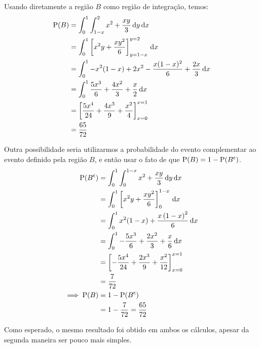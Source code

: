 \begin{example}
\begin{center}
    \end{center}

    Usando diretamente a região $B$ como região de integração,
    temos:
    \begin{align*}
        \operatorname{P}(B) &= 
            \int_0^1
                \int_{1-x}^2 x^2 + \frac{xy}{3} \,\mathrm{d} y
            \,\mathrm{d} x \\
        &= \int_0^1
            \left[x^2 y + \frac{xy^2}{6}\right]_{y=1-x}^{y=2}
        \,\mathrm{d} x \\
        &= \int_0^1
            - x^2 (1 - x) + 2 x^2 - \frac{x (1 - x)^2}{6} + \frac{2 x}{3}
        \,\mathrm{d} x \\
        &= \int_0^1
            \frac{5 x^{3}}{6} + \frac{4 x^{2}}{3} + \frac{x}{2}
        \,\mathrm{d} x \\
        &= \left[
            \frac{5 x^{4}}{24} + \frac{4 x^{3}}{9} + \frac{x^{2}}{4}
        \right]_{x=0}^{x=1} \\
        &= \frac{65}{72}
    \end{align*}

    Outra possibilidade seria utilizarmos a probabilidade
    do evento complementar ao evento definido pela região $B$,
    e então usar o fato de que $\operatorname{P}(B) = 1 - \operatorname{P}({B}^{\mathsf{c}})$.
    \begin{align*}
        \operatorname{P}({B}^{\mathsf{c}}) &= 
            \int_0^1
                \int_0^{1-x} x^2 + \frac{xy}{3} \,\mathrm{d} y
            \,\mathrm{d} x \\
        &= \int_0^1
            \left[x^2 y + \frac{xy^2}{6}\right]_0^{1-x}
        \,\mathrm{d} x \\
        &= \int_0^1
            x^2 (1 - x) + \frac{x \left(1 - x\right)^{2}}{6}
        \,\mathrm{d} x \\
        &= \int_0^1
            - \frac{5 x^{3}}{6} + \frac{2 x^{2}}{3} + \frac{x}{6}
        \,\mathrm{d} x \\
        &= \left[
            - \frac{5 x^{4}}{24} + \frac{2 x^{3}}{9} + \frac{x^{2}}{12}
        \right]_{x=0}^{x=1} \\
        &= \frac{7}{72}
        \\
        \implies \operatorname{P}(B) &= 1 - \operatorname{P}({B}^{\mathsf{c}}) \\
        &= 1 - \frac{7}{72} = \frac{65}{72}
    \end{align*}

    Como esperado, o mesmo resultado foi obtido em ambos os cálculos,
    apesar da segunda maneira ser pouco mais simples.
\end{example}

